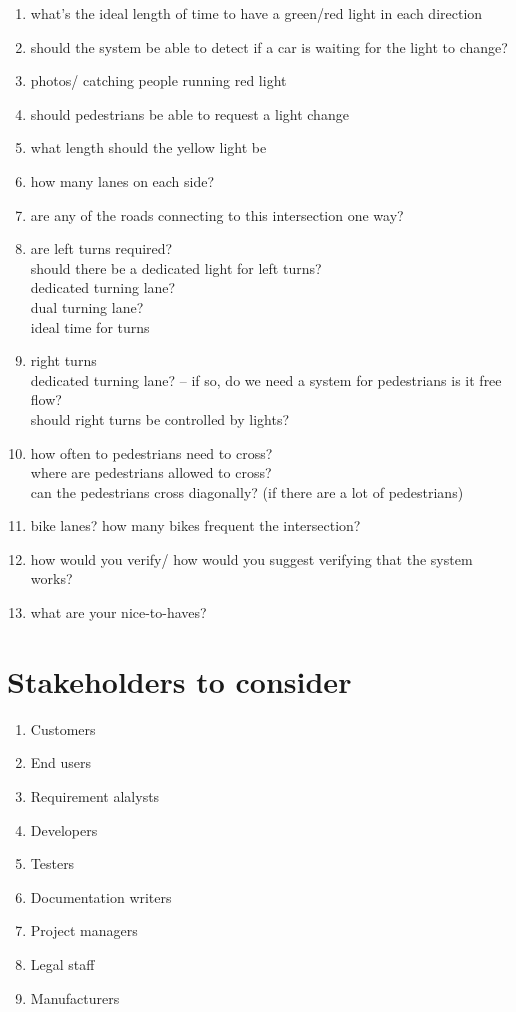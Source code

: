 \documentclass[letterpaper]{article}
\begin{document}
\begin{enumerate}
 \item what's the ideal length of time to have a green/red light in each direction
 \item should the system be able to detect if a car is waiting for the light to change?
 \item photos/ catching people running red light
 \item should pedestrians be able to request a light change
 \item what length should the yellow light be
       
 \item how many lanes on each side?
 \item are any of the roads connecting to this intersection one way?
 \item are left turns required?\\
       should there be a dedicated light for left turns?\\
       dedicated turning lane?\\
       dual turning lane?\\
       ideal time for turns
 \item right turns\\
       dedicated turning lane? -- if so, do we need a system for pedestrians
       is it free flow?\\
       should right turns be controlled by lights?
 \item how often to pedestrians need to cross?\\
       where are pedestrians allowed to cross?\\
       can the pedestrians cross diagonally? (if there are a lot of pedestrians)
 \item bike lanes? how many bikes frequent the intersection?
 \item how would you verify/ how would you suggest verifying that the system works?
       
       
       
       
 \item what are your nice-to-haves?
\end{enumerate}

\section{Stakeholders to consider}
\label{stakeholders}
\begin{enumerate}
 \item Customers
 \item End users
 \item Requirement alalysts
 \item Developers
 \item Testers
 \item Documentation writers
 \item Project managers
 \item Legal staff
 \item Manufacturers
\end{enumerate}
\end{document}
